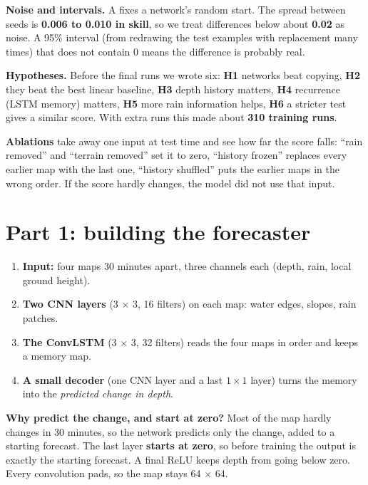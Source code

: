 \textbf{Noise and intervals.} A  fixes a network's random start. The spread between seeds is \textbf{0.006 to 0.010 in skill}, so we treat differences below about \textbf{0.02} as noise. A 95\% interval (from redrawing the test examples with replacement many times) that does not contain 0 means the difference is probably real.

\textbf{Hypotheses.} Before the final runs we wrote six: \textbf{H1} networks beat copying, \textbf{H2} they beat the best linear baseline, \textbf{H3} depth history matters, \textbf{H4} recurrence (LSTM memory) matters, \textbf{H5} more rain information helps, \textbf{H6} a stricter test gives a similar score. With extra runs this made about \textbf{310 training runs}.

\textbf{Ablations} take away one input at test time and see how far the score falls: ``rain removed'' and ``terrain removed'' set it to zero, ``history frozen'' replaces every earlier map with the last one, ``history shuffled'' puts the earlier maps in the wrong order. If the score hardly changes, the model did not use that input.

\section{Part 1: building the forecaster}\label{ch:build}

\begin{enumerate}
\item \textbf{Input:} four maps 30 minutes apart, three channels each (depth, rain, local ground height).
\item \textbf{Two CNN layers} (3 $\times$ 3, 16 filters) on each map: water edges, slopes, rain patches.
\item \textbf{The ConvLSTM} (3 $\times$ 3, 32 filters) reads the four maps in order and keeps a memory map.
\item \textbf{A small decoder} (one CNN layer and a last $1\times1$ layer) turns the memory into the \emph{predicted change in depth}.
\end{enumerate}

\textbf{Why predict the change, and start at zero?} Most of the map hardly changes in 30 minutes, so the network predicts only the change, added to a starting forecast. The last layer \textbf{starts at zero}, so before training the output is exactly the starting forecast. A final ReLU keeps depth from going below zero. Every convolution pads, so the map stays 64 $\times$ 64.

